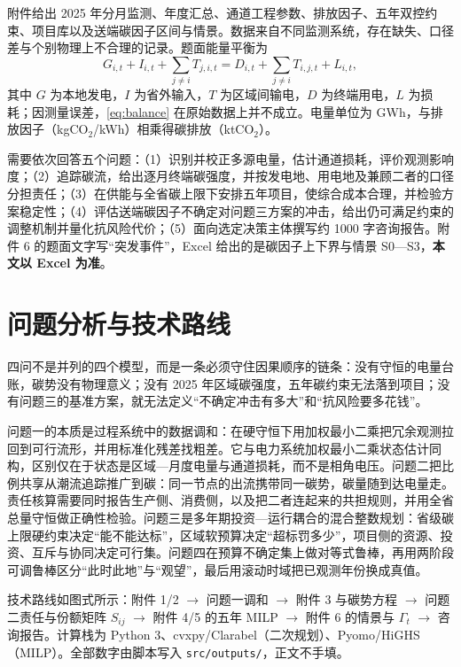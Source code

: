 \documentclass[UTF8,a4paper,zihao=-4,fontset=fandol]{ctexart}
\begin{document}
附件给出 2025 年分月监测、年度汇总、通道工程参数、排放因子、五年双控约束、项目库以及送端碳因子区间与情景。数据来自不同监测系统，存在缺失、口径差与个别物理上不合理的记录。题面能量平衡为
\begin{equation}
G_{i,t}+I_{i,t}+\sum_{j\neq i}T_{j,i,t}
=D_{i,t}+\sum_{j\neq i}T_{i,j,t}+L_{i,t},
\label{eq:balance}
\end{equation}
其中 $G$ 为本地发电，$I$ 为省外输入，$T$ 为区域间输电，$D$ 为终端用电，$L$ 为损耗；因测量误差，\eqref{eq:balance} 在原始数据上并不成立。电量单位为 GWh，与排放因子（kgCO$_2$/kWh）相乘得碳排放（ktCO$_2$）。

需要依次回答五个问题：（1）识别并校正多源电量，估计通道损耗，评价观测影响度；（2）追踪碳流，给出逐月终端碳强度，并按发电地、用电地及兼顾二者的口径分担责任；（3）在供能与全省碳上限下安排五年项目，使综合成本合理，并检验方案稳定性；（4）评估送端碳因子不确定对问题三方案的冲击，给出仍可满足约束的调整机制并量化抗风险代价；（5）面向选定决策主体撰写约 1000 字咨询报告。附件 6 的题面文字写“突发事件”，Excel 给出的是碳因子上下界与情景 S0—S3，\textbf{本文以 Excel 为准}。

\section{问题分析与技术路线}

四问不是并列的四个模型，而是一条必须守住因果顺序的链条：没有守恒的电量台账，碳势没有物理意义；没有 2025 年区域碳强度，五年碳约束无法落到项目；没有问题三的基准方案，就无法定义“不确定冲击有多大”和“抗风险要多花钱”。

问题一的本质是过程系统中的数据调和：在硬守恒下用加权最小二乘把冗余观测拉回到可行流形，并用标准化残差找粗差。它与电力系统加权最小二乘状态估计同构，区别仅在于状态是区域—月度电量与通道损耗，而不是相角电压。问题二把比例共享从潮流追踪推广到碳：同一节点的出流携带同一碳势，碳量随到达电量走。责任核算需要同时报告生产侧、消费侧，以及把二者连起来的共担规则，并用全省总量守恒做正确性检验。问题三是多年期投资—运行耦合的混合整数规划：省级碳上限硬约束决定“能不能达标”，区域软预算决定“超标罚多少”，项目侧的资源、投资、互斥与协同决定可行集。问题四在预算不确定集上做对等式鲁棒，再用两阶段可调鲁棒区分“此时此地”与“观望”，最后用滚动时域把已观测年份换成真值。

技术路线如图式所示：附件 1/2 $\to$ 问题一调和 $\to$ 附件 3 与碳势方程 $\to$ 问题二责任与份额矩阵 $S_{ij}$ $\to$ 附件 4/5 的五年 MILP $\to$ 附件 6 的情景与 $\Gamma_t$ $\to$ 咨询报告。计算栈为 Python 3、cvxpy/Clarabel（二次规划）、Pyomo/HiGHS（MILP）。全部数字由脚本写入 \texttt{src/outputs/}，正文不手填。
\end{document}
